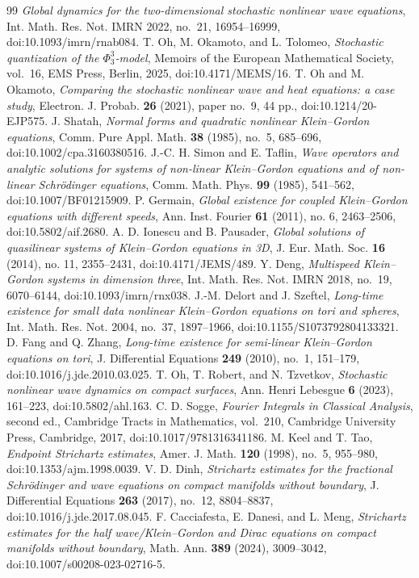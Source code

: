 \documentclass[10pt]{amsart}
\numberwithin{equation}{section}
\theoremstyle{plain}
\theoremstyle{definition}
\theoremstyle{remark}
\begin{document}
\begin{thebibliography}{99}
\emph{Global dynamics for the two-dimensional stochastic nonlinear wave equations},
Int. Math. Res. Not. IMRN 2022, no.~21, 16954--16999, doi:10.1093/imrn/rnab084.
T. Oh, M. Okamoto, and L. Tolomeo,
\emph{Stochastic quantization of the \(\Phi^3_3\)-model},
Memoirs of the European Mathematical Society, vol.~16, EMS Press, Berlin, 2025, doi:10.4171/MEMS/16.
T. Oh and M. Okamoto,
\emph{Comparing the stochastic nonlinear wave and heat equations: a case study},
Electron. J. Probab. \textbf{26} (2021), paper no.~9, 44 pp., doi:10.1214/20-EJP575.
J. Shatah,
\emph{Normal forms and quadratic nonlinear Klein--Gordon equations},
Comm. Pure Appl. Math. \textbf{38} (1985), no.~5, 685--696, doi:10.1002/cpa.3160380516.
J.-C. H. Simon and E. Taflin,
\emph{Wave operators and analytic solutions for systems of non-linear Klein--Gordon equations and of non-linear Schr\"odinger equations},
Comm. Math. Phys. \textbf{99} (1985), 541--562, doi:10.1007/BF01215909.
P. Germain,
\emph{Global existence for coupled Klein--Gordon equations with different speeds},
Ann. Inst. Fourier \textbf{61} (2011), no. 6, 2463--2506, doi:10.5802/aif.2680.
A. D. Ionescu and B. Pausader,
\emph{Global solutions of quasilinear systems of Klein--Gordon equations in 3D},
J. Eur. Math. Soc. \textbf{16} (2014), no. 11, 2355--2431, doi:10.4171/JEMS/489.
Y. Deng,
\emph{Multispeed Klein--Gordon systems in dimension three},
Int. Math. Res. Not. IMRN 2018, no.~19, 6070--6144, doi:10.1093/imrn/rnx038.
J.-M. Delort and J. Szeftel,
\emph{Long-time existence for small data nonlinear Klein--Gordon equations on tori and spheres},
Int. Math. Res. Not. 2004, no.~37, 1897--1966, doi:10.1155/S1073792804133321.
D. Fang and Q. Zhang,
\emph{Long-time existence for semi-linear Klein--Gordon equations on tori},
J. Differential Equations \textbf{249} (2010), no.~1, 151--179, doi:10.1016/j.jde.2010.03.025.
T. Oh, T. Robert, and N. Tzvetkov,
\emph{Stochastic nonlinear wave dynamics on compact surfaces},
Ann. Henri Lebesgue \textbf{6} (2023), 161--223, doi:10.5802/ahl.163.
C. D. Sogge,
\emph{Fourier Integrals in Classical Analysis}, second ed.,
Cambridge Tracts in Mathematics, vol.~210, Cambridge University Press, Cambridge, 2017, doi:10.1017/9781316341186.
M. Keel and T. Tao,
\emph{Endpoint Strichartz estimates},
Amer. J. Math. \textbf{120} (1998), no.~5, 955--980, doi:10.1353/ajm.1998.0039.
V. D. Dinh,
\emph{Strichartz estimates for the fractional Schr\"odinger and wave equations on compact manifolds without boundary},
J. Differential Equations \textbf{263} (2017), no.~12, 8804--8837, doi:10.1016/j.jde.2017.08.045.
F. Cacciafesta, E. Danesi, and L. Meng,
\emph{Strichartz estimates for the half wave/Klein--Gordon and Dirac equations on compact manifolds without boundary},
Math. Ann. \textbf{389} (2024), 3009--3042, doi:10.1007/s00208-023-02716-5.

\enlargethispage{3\baselineskip}
\end{thebibliography}
\end{document}
